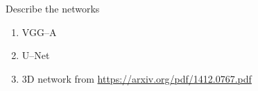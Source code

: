   Describe the networks

  \begin{enumerate}
  \item VGG--A
  \item U--Net
  \item 3D network from \url{https://arxiv.org/pdf/1412.0767.pdf}
  \end{enumerate}




